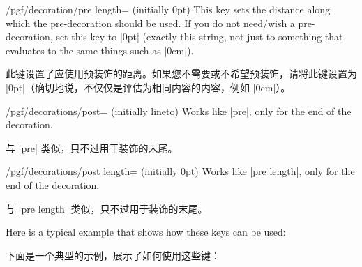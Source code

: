 \begin{key}{/pgf/decoration/pre length= (initially 0pt)}
    This key sets the distance along which the pre-decoration should be used.
    If you do not need/wish a pre-decoration, set this key to |0pt| (exactly
    this string, not just to something that evaluates to the same things such
    as |0cm|).

    此键设置了应使用预装饰的距离。如果您不需要或不希望预装饰，请将此键设置为 |0pt|（确切地说，不仅仅是评估为相同内容的内容，例如 |0cm|）。


\end{key}

\begin{key}{/pgf/decorations/post= (initially lineto)}
    Works like |pre|, only for the end of the decoration.

    与 |pre| 类似，只不过用于装饰的末尾。

\end{key}

\begin{key}{/pgf/decorations/post length= (initially 0pt)}
    Works like |pre length|, only for the end of the decoration.

    与 |pre length| 类似，只不过用于装饰的末尾。
\end{key}

Here is a typical example that shows how these keys can be used:

下面是一个典型的示例，展示了如何使用这些键：

\begin{codeexample}[preamble={\usetikzlibrary{decorations.pathmorphing}}]
\end{codeexample}
